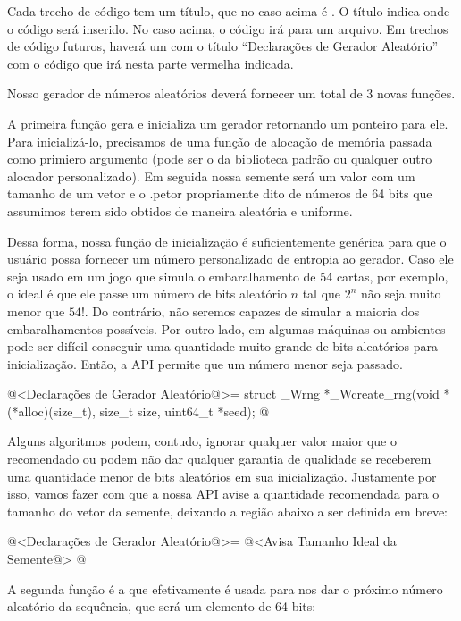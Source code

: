 Cada trecho de código tem um título, que no caso acima
é . O título indica onde o código será
inserido. No caso acima, o código irá para um arquivo. Em trechos de
código futuros, haverá um com o título ``Declarações de Gerador
Aleatório'' com o código que irá nesta parte vermelha indicada.


Nosso gerador de números aleatórios deverá fornecer um total de 3
novas funções.

A primeira função gera e inicializa um gerador retornando um ponteiro
para ele. Para inicializá-lo, precisamos de uma função de alocação de
memória passada como primiero argumento (pode ser o  da
biblioteca padrão ou qualquer outro alocador personalizado). Em
seguida nossa semente será um valor com um tamanho de um vetor e o
.petor propriamente dito de números de 64 bits que assumimos terem sido
obtidos de maneira aleatória e uniforme.

Dessa forma, nossa função de inicialização é suficientemente genérica
para que o usuário possa fornecer um número personalizado de entropia
ao gerador. Caso ele seja usado em um jogo que simula o embaralhamento
de 54 cartas, por exemplo, o ideal é que ele passe um número de bits
aleatório $n$ tal que $2^n$ não seja muito menor que $54!$. Do
contrário, não seremos capazes de simular a maioria dos
embaralhamentos possíveis. Por outro lado, em algumas máquinas ou
ambientes pode ser difícil conseguir uma quantidade muito grande de
bits aleatórios para inicialização. Então, a API permite que um número
menor seja passado.

\iniciocodigo
@<Declarações de Gerador Aleatório@>=
struct _Wrng *_Wcreate_rng(void *(*alloc)(size_t), size_t size, uint64_t *seed);
@
\fimcodigo

Alguns algoritmos podem, contudo, ignorar qualquer valor maior que o
recomendado ou podem não dar qualquer garantia de qualidade se
receberem uma quantidade menor de bits aleatórios em sua
inicialização. Justamente por isso, vamos fazer com que a nossa API
avise a quantidade recomendada para o tamanho do vetor da semente,
deixando a região abaixo a ser definida em breve:

\iniciocodigo
@<Declarações de Gerador Aleatório@>=
@<Avisa Tamanho Ideal da Semente@>
@
\fimcodigo

A segunda função é a que efetivamente é usada para nos dar o próximo
número aleatório da sequência, que será um elemento de 64 bits:

